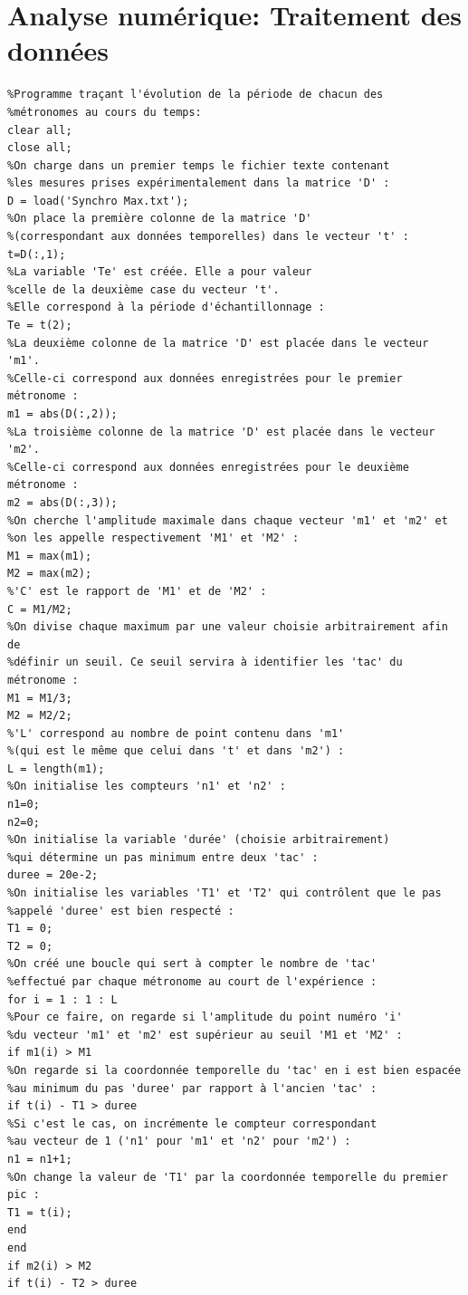 \documentclass[a4paper,11pt]{report}
\begin{document}
\chapter{Analyse numérique: Traitement des données}
\label{Traitement}
\begin{verbatim}
%Programme traçant l'évolution de la période de chacun des 
%métronomes au cours du temps:
clear all;
close all;
%On charge dans un premier temps le fichier texte contenant
%les mesures prises expérimentalement dans la matrice 'D' :
D = load('Synchro Max.txt');
%On place la première colonne de la matrice 'D'
%(correspondant aux données temporelles) dans le vecteur 't' :
t=D(:,1);
%La variable 'Te' est créée. Elle a pour valeur
%celle de la deuxième case du vecteur 't'.
%Elle correspond à la période d'échantillonnage :
Te = t(2);
%La deuxième colonne de la matrice 'D' est placée dans le vecteur 'm1'.
%Celle-ci correspond aux données enregistrées pour le premier métronome :
m1 = abs(D(:,2));
%La troisième colonne de la matrice 'D' est placée dans le vecteur 'm2'.
%Celle-ci correspond aux données enregistrées pour le deuxième métronome :
m2 = abs(D(:,3));
%On cherche l'amplitude maximale dans chaque vecteur 'm1' et 'm2' et
%on les appelle respectivement 'M1' et 'M2' :
M1 = max(m1);
M2 = max(m2);
%'C' est le rapport de 'M1' et de 'M2' :
C = M1/M2;
%On divise chaque maximum par une valeur choisie arbitrairement afin de
%définir un seuil. Ce seuil servira à identifier les 'tac' du métronome :
M1 = M1/3;
M2 = M2/2;
%'L' correspond au nombre de point contenu dans 'm1'
%(qui est le même que celui dans 't' et dans 'm2') :
L = length(m1);
%On initialise les compteurs 'n1' et 'n2' :
n1=0;
n2=0;
%On initialise la variable 'durée' (choisie arbitrairement)
%qui détermine un pas minimum entre deux 'tac' :
duree = 20e-2;
%On initialise les variables 'T1' et 'T2' qui contrôlent que le pas
%appelé 'duree' est bien respecté :
T1 = 0;
T2 = 0;
%On créé une boucle qui sert à compter le nombre de 'tac'
%effectué par chaque métronome au court de l'expérience :
for i = 1 : 1 : L
%Pour ce faire, on regarde si l'amplitude du point numéro 'i'
%du vecteur 'm1' et 'm2' est supérieur au seuil 'M1 et 'M2' :
if m1(i) > M1
%On regarde si la coordonnée temporelle du 'tac' en i est bien espacée
%au minimum du pas 'duree' par rapport à l'ancien 'tac' :
if t(i) - T1 > duree
%Si c'est le cas, on incrémente le compteur correspondant
%au vecteur de 1 ('n1' pour 'm1' et 'n2' pour 'm2') :
n1 = n1+1;
%On change la valeur de 'T1' par la coordonnée temporelle du premier pic :
T1 = t(i);
end
end
if m2(i) > M2
if t(i) - T2 > duree

\end{verbatim}
\end{document}
